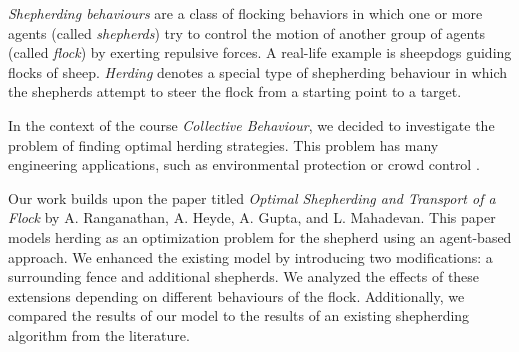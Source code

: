 \textit{Shepherding behaviours} are a class of flocking behaviors in which one or more agents (called \textit{shepherds}) try to control the motion of another group of agents (called \textit{flock}) by exerting repulsive forces. A real-life example is sheepdogs guiding flocks of sheep. \textit{Herding} denotes a special type of shepherding behaviour in which the shepherds attempt to steer the flock from a starting point to a target. \cite{lien2003shepherding}

In the context of the course \textit{Collective Behaviour}, we decided to investigate the problem of finding optimal herding strategies. This problem has many engineering applications, such as environmental protection or crowd control \cite{baxter2021simulating}.

Our work builds upon the paper titled \textit{Optimal Shepherding and Transport of a Flock} \cite{ranganathan2022optimal} by A. Ranganathan, A. Heyde, A. Gupta, and L. Mahadevan. This paper models herding as an optimization problem for the shepherd using an agent-based approach. We enhanced the existing model by introducing two modifications: a surrounding fence and additional shepherds. We analyzed the effects of these extensions depending on different behaviours of the flock. Additionally, we compared the results of our model to the results of an existing shepherding algorithm from the literature.